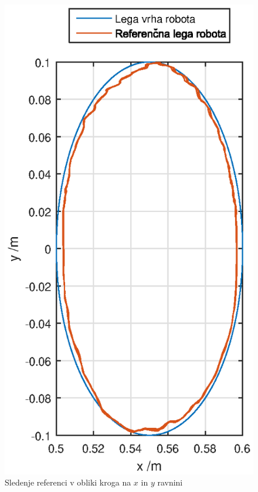 \begin{figure}
	\centering
	\includegraphics[scale=0.5]{./Slike/torque_follow_circle.eps}
	\caption{Sledenje referenci v obliki kroga na $x$ in $y$ ravnini}
	\label{fig:torque_follow_circle}
\end{figure}
